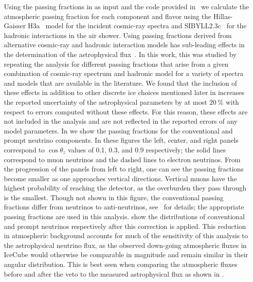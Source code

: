 Using the passing fractions in  as input and the \nuveto{} code provided in~\cite{Arguelles:2018awr} we calculate the atmospheric passing fraction for each component and flavor using the Hillas-Gaisser H3a~\cite{Gaisser:2013bla,Gaisser:2011cc,Hillas:2006ms} model for the incident cosmic-ray spectra and SIBYLL2.3c~\cite{Riehn:2017mfm} for the hadronic interactions in the air shower.
Using passing fractions derived from alternative cosmic-ray and hadronic interaction models has sub-leading effects in the determination of the astrophysical flux~\cite{Arguelles:2018awr}.
In this work, this was studied by repeating the analysis for different passing fractions that arise from a given combination of cosmic-ray spectrum and hadronic model for a variety of spectra and models that are available in the literature.
We found that the inclusion of these effects in addition to other discrete ice choices mentioned later in  increases the reported uncertainty of the astrophysical parameters by at most $\SI{20}\percent$ with respect to errors computed without these effects.
For this reason, these effects are not included in the analysis and are not reflected in the reported errors of any model parameters.
In  we show the passing fractions for the conventional and prompt neutrino components.
In these figures the left, center, and right panels correspond to $\cos\theta_z$ values of 0.1, 0.3, and 0.9 respectively; the solid lines correspond to muon neutrinos and the dashed lines to electron neutrinos.
From the progression of the panels from left to right, one can see the passing fractions become smaller as one approaches vertical directions.
Vertical muons have the highest probability of reaching the detector, as the overburden they pass through is the smallest.
Though not shown in this figure, the conventional passing fractions differ from neutrinos to anti-neutrinos, see~\cite{Arguelles:2018awr} for details; the appropriate passing fractions are used in this analysis.
 show the distributions of conventional and prompt neutrinos respectively after this correction is applied.
This reduction in atmospheric background accounts for much of the sensitivity of this analysis to the astrophysical neutrino flux, as the observed down-going atmospheric fluxes in IceCube would otherwise be comparable in magnitude and remain similar in their angular distribution.
This is best seen when comparing the atmospheric fluxes before and after the veto to the measured astrophysical flux as shown in .


